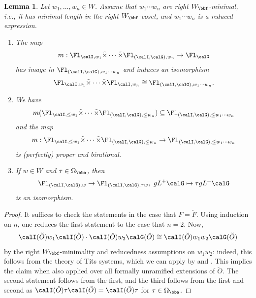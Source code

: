 \documentclass[10pt, reqno]{amsart}
\theoremstyle{plain}
\newtheorem{lemma}[theorem]{Lemma}
\theoremstyle{definition}
\numberwithin{equation}{section}
\begin{document}
	\begin{lemma}
		\label{sec:geometry-affine-flag-2-properties-of-convolution}
		Let $w_1,\ldots, w_n\in W$. Assume that $w_1\cdots w_n$ are right $W_\bbf$-minimal, i.e., it has minimal length in the right $W_\bbf$-coset, and $w_1\cdots w_n$ is a reduced expression.
		\begin{enumerate}
			\item The map
			\begin{equation}
				m: \Fl_{\calI, w_1}\tilde{\times}\cdots \tilde{\times} \Fl_{(\calI,\calG),w_n}\to \Fl_{\calG}
			\end{equation}
			has image in $\Fl_{(\calI,\calG), w_1\cdots w_n}$ and induces an isomorphism
			\begin{equation}
				\Fl_{\calI, w_1}\tilde{\times}\cdots \tilde{\times} \Fl_{\calI,w_n}\cong \Fl_{(\calI,\calG), w_1\cdots w_n}.
			\end{equation}
			\item We have
			\begin{equation}
				m(\Fl_{\calI,\leq w_1}\tilde{\times}\cdots \tilde{\times} \Fl_{(\calI,\calG),\leq w_n})\subseteq \Fl_{(\calI,\calG), \leq w_1\cdots w_n}
			\end{equation}
			and the map
			\begin{equation}
				m:\Fl_{\calI, \leq w_1}\tilde{\times}\cdots \tilde{\times} \Fl_{(\calI,\calG), \leq w_n}\to \Fl_{(\calI,\calG), \leq w_1\cdots w_n}
			\end{equation}
			is (perfectly) proper and birational.
			\item If $w\in W$ and $\tau\in \Omega_{\bba}$, then
			\begin{equation}
				\Fl_{(\calI,\calG), w}\to \Fl_{(\calI,\calG), \tau w},\ gL^+\calG\mapsto \tau g L^+\calG 
			\end{equation}
			is an isomorphism.
		\end{enumerate}
	\end{lemma}
	\begin{proof}
		It suffices to check the statements in the case that $F=\breve{F}$.
		Using induction on $n$, one reduces the first statement to the case that $n=2$. Now, 
		\begin{equation}
			\calI(\breve{O})w_1\calI(\breve{O})\cdot \calI(\breve{O})w_2\calG(\breve{O})\cong \calI(\breve{O})w_1w_2\calG(\breve{O})
		\end{equation}
		by the right $W_\bbf$-minimality and reducedness assumptions on $w_1w_2$: indeed, this follows from the theory of Tits systems, which we can apply by \cite[Section 6.5]{BT72} and \cite[Corollaire 4.6.7]{BT84}. This implies the claim when also applied over all formally unramified extensions of $\breve{O}$.
		The second statement follows from the first, and the third follows from the first and second as $\calI(\breve{O})\tau \calI(\breve{O})= \calI(\breve{O})\tau$ for $\tau\in \Omega_{\bba}$.
	\end{proof}
	
\end{document}
